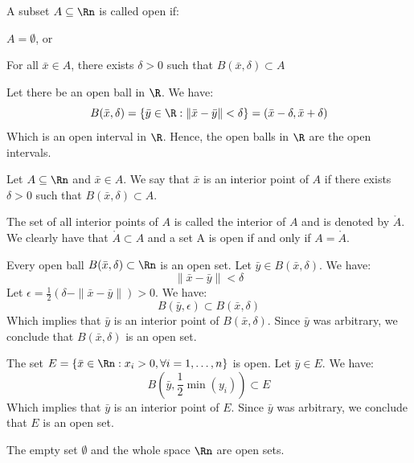\begin{definition}
    A subset $A \subseteq \Rn$ is called open if:
    \begin{citemize}
        \item $A = \emptyset$, or
        \item For all $\bar{x} \in A$, there exists $\delta > 0$ such that $B(\bar{x}, \delta) \subset A$
    \end{citemize}
\end{definition}

\begin{eg}
    Let there be an open ball in $\R$. We have:
    \[
        B(\bar{x}, \delta) = \{\bar{y} \in \R : \|\bar{x} - \bar{y}\| < \delta\} = (\bar{x} - \delta, \bar{x} + \delta) 
    \]
    Which is an open interval in $\R$. Hence, the open balls in $\R$ are the open intervals.
\end{eg}

\begin{definition}
    Let $A \subseteq \Rn$ and $\bar{x} \in A$. We say that $\bar{x}$ is an interior point of $A$ if there exists $\delta > 0$ such that $B(\bar{x}, \delta) \subset A$.
\end{definition}
The set of all interior points of $A$ is called the interior of $A$ and is denoted by $\mathring{A}$. We clearly have that $\mathring{A} \subset A$ and a set A is open if and only if $A = \mathring{A}$.

\begin{eg}
    Every open ball $B(\bar{x}, \delta) \subset \Rn$ is an open set. Let $\bar{y} \in B(\bar{x}, \delta)$. We have:
    \[
        \|\bar{x} - \bar{y}\| < \delta
    \]
    Let $\epsilon = \frac{1}{2} \left(\delta - \|\bar{x} - \bar{y}\|\right) > 0$. We have:
    \[
        B(\bar{y}, \epsilon) \subset B(\bar{x}, \delta)
    \]
    Which implies that $\bar{y}$ is an interior point of $B(\bar{x}, \delta)$. Since $\bar{y}$ was arbitrary, we conclude that $B(\bar{x}, \delta)$ is an open set.
\end{eg}

\begin{eg}
    The set $E = \{\bar{x} \in \Rn : x_i > 0, \forall i = 1, \ldots, n\}$ is open. Let $\bar{y} \in E$. We have:
    \[
        B(\bar{y}, \frac{1}{2} \min(y_i)) \subset E
    \]
    Which implies that $\bar{y}$ is an interior point of $E$. Since $\bar{y}$ was arbitrary, we conclude that $E$ is an open set.
\end{eg}
The empty set $\emptyset$ and the whole space $\Rn$ are open sets.

